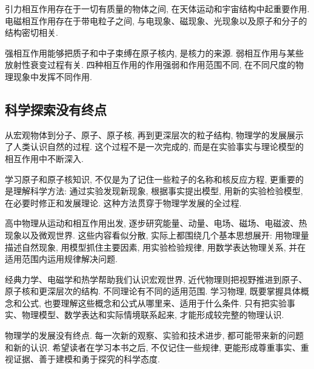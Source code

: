 \documentclass[UTF8,openany,fontset=fandol]{ctexbook}
\theoremstyle{chinesetextbook}
\begin{document}
引力相互作用存在于一切有质量的物体之间, 在天体运动和宇宙结构中起重要作用. 电磁相互作用存在于带电粒子之间, 与电现象、磁现象、光现象以及原子和分子的结构密切相关.

强相互作用能够把质子和中子束缚在原子核内, 是核力的来源. 弱相互作用与某些放射性衰变过程有关. 四种相互作用的作用强弱和作用范围不同, 在不同尺度的物理现象中发挥不同作用.
\subsection{科学探索没有终点}
从宏观物体到分子、原子、原子核, 再到更深层次的粒子结构, 物理学的发展展示了人类认识自然的过程. 这个过程不是一次完成的, 而是在实验事实与理论模型的相互作用中不断深入.

学习原子和原子核知识, 不仅是为了记住一些粒子的名称和核反应方程, 更重要的是理解科学方法: 通过实验发现新现象, 根据事实提出模型, 用新的实验检验模型, 在必要时修正和发展理论. 这种方法贯穿于物理学发展的全过程.

\bigskip

高中物理从运动和相互作用出发, 逐步研究能量、动量、电场、磁场、电磁波、热现象以及微观世界. 这些内容看似分散, 实际上都围绕几个基本思想展开: 用物理量描述自然现象, 用模型抓住主要因素, 用实验检验规律, 用数学表达物理关系, 并在适用范围内运用规律解决问题.

经典力学、电磁学和热学帮助我们认识宏观世界, 近代物理则把视野推进到原子、原子核和更深层次的结构. 不同理论有不同的适用范围. 学习物理, 既要掌握具体概念和公式, 也要理解这些概念和公式从哪里来、适用于什么条件. 只有把实验事实、物理模型、数学表达和实际情境联系起来, 才能形成较完整的物理认识.

物理学的发展没有终点. 每一次新的观察、实验和技术进步, 都可能带来新的问题和新的认识. 希望读者在学习本书之后, 不仅记住一些规律, 更能形成尊重事实、重视证据、善于建模和勇于探究的科学态度.
\end{document}
